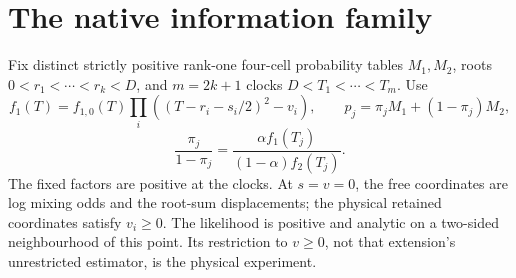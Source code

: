 \section{The native information family}\label{sec:native}
Fix distinct strictly positive rank-one four-cell probability tables $M_1,M_2$, roots $0<r_1<\cdots<r_k<D$, and $m=2k+1$ clocks $D<T_1<\cdots<T_m$. Use
\[
 f_1(T)=f_{1,0}(T)\prod_i((T-r_i-s_i/2)^2-v_i),\qquad
 p_j=\pi_jM_1+(1-\pi_j)M_2,
\]
\[
 \frac{\pi_j}{1-\pi_j}=\frac{\alpha f_1(T_j)}{(1-\alpha)f_2(T_j)}.
\]
The fixed factors are positive at the clocks. At $s=v=0$, the free coordinates are log mixing odds and the root-sum displacements; the physical retained coordinates satisfy $v_i\ge0$. The likelihood is positive and analytic on a two-sided neighbourhood of this point. Its restriction to $v\ge0$, not that extension's unrestricted estimator, is the physical experiment.

